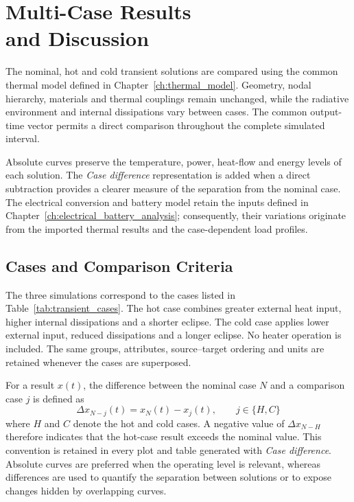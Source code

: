 \chapter[Multi-Case Results and Discussion]
{Multi-Case Results\\and Discussion}
\label{ch:results_discussion}

The nominal, hot and cold transient solutions are compared using the common
thermal model defined in Chapter~\ref{ch:thermal_model}. Geometry, nodal
hierarchy, materials and thermal couplings remain unchanged, while the
radiative environment and internal dissipations vary between cases. The
common output-time vector permits a direct comparison throughout the complete
simulated interval.

Absolute curves preserve the temperature, power, heat-flow and energy levels
of each solution. The \textit{Case difference} representation is added when a
direct subtraction provides a clearer measure of the separation from the
nominal case. The electrical conversion and battery model retain the inputs
defined in Chapter~\ref{ch:electrical_battery_analysis}; consequently, their
variations originate from the imported thermal results and the case-dependent
load profiles.


\section{Cases and Comparison Criteria}
\label{sec:comparison_criteria}

The three simulations correspond to the cases listed in
Table~\ref{tab:transient_cases}. The hot case combines greater external heat
input, higher internal dissipations and a shorter eclipse. The cold case
applies lower external input, reduced dissipations and a longer eclipse. No
heater operation is included. The same groups, attributes, source--target
ordering and units are retained whenever the cases are superposed.

For a result $x(t)$, the difference between the nominal case $N$ and a
comparison case $j$ is defined as
\begin{equation}
    \Delta x_{N-j}(t)
    =
    x_N(t)-x_j(t),
    \qquad
    j\in\{H,C\}
    \label{eq:results_case_difference}
\end{equation}
where $H$ and $C$ denote the hot and cold cases. A negative value of
$\Delta x_{N-H}$ therefore indicates that the hot-case result exceeds the
nominal value. This convention is retained in every plot and table generated
with \textit{Case difference}. Absolute curves are preferred when the
operating level is relevant, whereas differences are used to quantify the
separation between solutions or to expose changes hidden by overlapping
curves.


